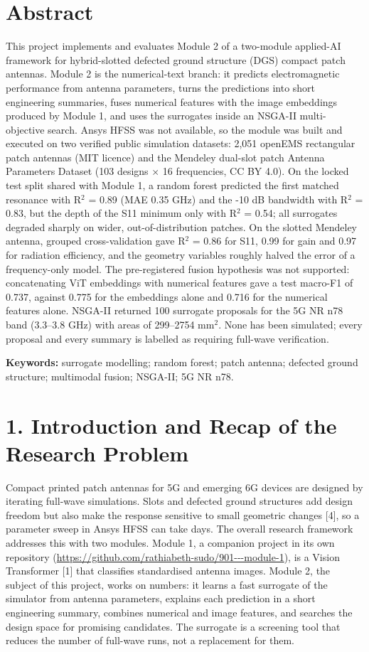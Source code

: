 \documentclass[11pt,a4paper]{article}
\begin{document}
\section*{Abstract}
This project implements and evaluates Module 2 of a two-module applied-AI framework for hybrid-slotted defected ground structure (DGS) compact patch antennas. Module 2 is the numerical-text branch: it predicts electromagnetic performance from antenna parameters, turns the predictions into short engineering summaries, fuses numerical features with the image embeddings produced by Module 1, and uses the surrogates inside an NSGA-II multi-objective search. Ansys HFSS was not available, so the module was built and executed on two verified public simulation datasets: 2,051 openEMS rectangular patch antennas (MIT licence) and the Mendeley dual-slot patch Antenna Parameters Dataset (103 designs $\times$ 16 frequencies, CC BY 4.0). On the locked test split shared with Module 1, a random forest predicted the first matched resonance with R$^2$ = 0.89 (MAE 0.35 GHz) and the -10 dB bandwidth with R$^2$ = 0.83, but the depth of the S11 minimum only with R$^2$ = 0.54; all surrogates degraded sharply on wider, out-of-distribution patches. On the slotted Mendeley antenna, grouped cross-validation gave R$^2$ = 0.86 for S11, 0.99 for gain and 0.97 for radiation efficiency, and the geometry variables roughly halved the error of a frequency-only model. The pre-registered fusion hypothesis was not supported: concatenating ViT embeddings with numerical features gave a test macro-F1 of 0.737, against 0.775 for the embeddings alone and 0.716 for the numerical features alone. NSGA-II returned 100 surrogate proposals for the 5G NR n78 band (3.3--3.8 GHz) with areas of 299--2754 mm$^2$. None has been simulated; every proposal and every summary is labelled as requiring full-wave verification.

\textbf{Keywords:} surrogate modelling; random forest; patch antenna; defected ground structure; multimodal fusion; NSGA-II; 5G NR n78.

\section*{1. Introduction and Recap of the Research Problem}
Compact printed patch antennas for 5G and emerging 6G devices are designed by iterating full-wave simulations. Slots and defected ground structures add design freedom but also make the response sensitive to small geometric changes [4], so a parameter sweep in Ansys HFSS can take days. The overall research framework addresses this with two modules. Module 1, a companion project in its own repository (\url{https://github.com/rathiabeth-sudo/901---module-1}), is a Vision Transformer [1] that classifies standardised antenna images. Module 2, the subject of this project, works on numbers: it learns a fast surrogate of the simulator from antenna parameters, explains each prediction in a short engineering summary, combines numerical and image features, and searches the design space for promising candidates. The surrogate is a screening tool that reduces the number of full-wave runs, not a replacement for them.
\end{document}
